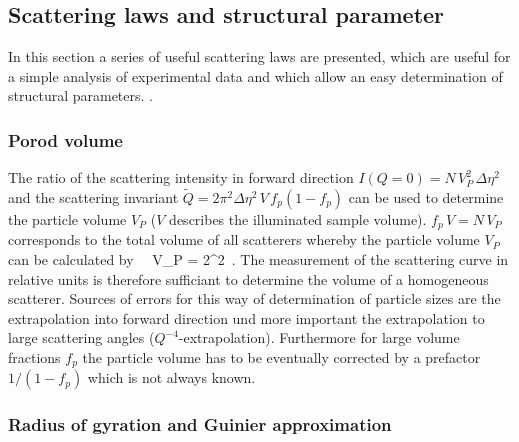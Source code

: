 \subsection{Scattering laws and structural parameter}

In this section a series of useful scattering laws are presented, which
are useful for a simple analysis of experimental data and which allow an
easy determination of structural parameters.
\cite{book:Guinier:Fournet}.

\subsubsection{Porod volume}

The ratio of the scattering intensity in forward direction $I(Q=0)=N\,
V_P^2\, \Delta\eta^2$ and the scattering invariant  $\tilde Q =
2\pi^2\Delta\eta^2\, V\, f_p(1-f_p)$ can be used to determine the particle volume $V_P$
($V$ describes the illuminated sample volume).
$f_p\, V = N\, V_P$ corresponds to the total volume of all scatterers
whereby the particle volume $V_P$ can be calculated by
\BE
{} \,  \,  V_P
        = 2\pi^2\,  .
\EE
The measurement of the scattering curve in relative units is therefore sufficiant
to determine the volume of a homogeneous scatterer. Sources of errors for this way
of determination of particle sizes are the extrapolation into forward direction und
more important the extrapolation to large scattering angles
($Q^{-4}$-extrapolation). Furthermore for large volume fractions $f_p$
the particle volume has to be eventually corrected by a prefactor
$1/(1-f_p)$ which is not always known.

\subsubsection{Radius of gyration and Guinier approximation}

